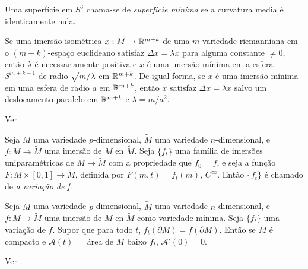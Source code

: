\begin{definicao}
	Uma superfície em $S^3$ chama-se de \emph{superfície mínima} se a curvatura media é identicamente nula.
\end{definicao}

\begin{teorema}\label{thm:takahashi}
	Se uma imersão isométrica $x: M \rightarrow \mathbb R^{m+k}$ de uma $m$-variedade riemanniana em o $(m+k)$-espaço euclideano satisfaz $ \Delta x = \lambda x $ para alguma constante $\neq 0$, então $\lambda$ é necessariamente positiva e $x$ é uma imersão mínima em a esfera $S^{m+k-1}$ de radio $\sqrt{m/\lambda}$ em $\mathbb R^{m+k}$. De igual forma, se $x$ é uma imersão mínima em uma esfera de radio $a$ em $\mathbb R^{m+k}$, então $x$ satisfaz $\Delta x = \lambda x$ salvo um deslocamento paralelo em $\mathbb R^{m+k}$ e $\lambda = m/a^2$.
\end{teorema}

\begin{demonstracao}
	Ver \cite[Theorem 3]{TAKAHASHI1966}.
\end{demonstracao}

\begin{definicao}
	Seja $M$ uma variedade $p$-dimensional, $\tilde{M}$ uma variedade $n$-dimensional, e $f: M \rightarrow \tilde{M}$ uma imersão de $M$ en $\tilde{M}$.
	Seja $\{ f_t \}$ uma família de imersões uniparamétricas de $M \rightarrow \tilde{M}$ com a propriedade que $f_0 = f$, e seja a função $F: M \times [0,1] \rightarrow \tilde{M}$, definida por $F(m,t) = f_t(m)$, $C^{\infty}$. Então $\{ f_t \}$ é chamado de \emph{a variação de f}.
\end{definicao}

\begin{teorema}\label{thm:minimo-e-compacto-implica-ser-ponto-minimo-do-funcional-de-area}
	Seja $M$ uma variedade $p$-dimensional, $\tilde{M}$ uma variedade $n$-dimensional, e $f: M \rightarrow \tilde{M}$ uma imersão de $M$ en $\tilde{M}$ como variedade mínima.
	Seja $\{ f_t \}$ uma variação de $f$. Supor que para todo $t$, $ f_t(\partial M) = f(\partial M) $. Então se $M$ é compacto e $\mathcal{A}(t) =$ área de $M$ baixo $f_t$, $\mathcal{A}'(0)=0$.
\end{teorema}

\begin{demonstracao}
	Ver \cite[Theorem 3.2.1]{Simons1968}.
\end{demonstracao}

